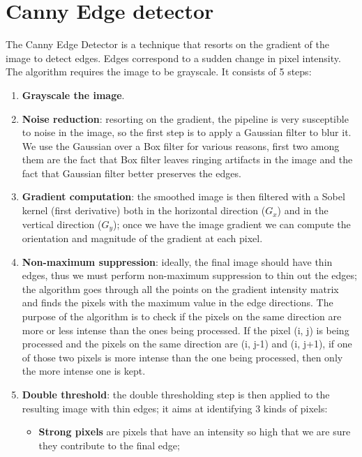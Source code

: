 \documentclass{article}
\begin{document}
\newpage

\section*{Canny Edge detector}

The Canny Edge Detector is a technique that resorts on the gradient of the image to detect
edges. Edges correspond to a sudden change in pixel intensity. The algorithm requires the image
to be grayscale. It consists of 5 steps:

\begin{enumerate}[start=0]
    \item \textbf{Grayscale the image}.
    \item \textbf{Noise reduction}: resorting on the gradient, the pipeline is very susceptible to noise in the image, so the first step is to apply a Gaussian filter to blur it. We use the Gaussian over a Box filter for various reasons, first two among them are the fact that Box filter leaves ringing artifacts in the image and the fact that Gaussian filter better preserves the edges.
    \item \textbf{Gradient computation}: the smoothed image is then filtered with a Sobel kernel (first derivative) both in the horizontal direction ($G_x$) and in the vertical direction ($G_y$); once we have the image gradient we can compute the orientation and magnitude of the gradient at each pixel.
    \item \textbf{Non-maximum suppression}: ideally, the final image should have thin edges, thus we must perform non-maximum suppression to thin out the edges; the algorithm goes through all the points on the gradient intensity matrix and finds the pixels with the maximum value in the edge directions. The purpose of the algorithm is to check if the pixels on the same direction are more or less intense than the ones being processed. If the pixel (i, j) is being processed and the pixels on the same direction are (i, j-1) and (i, j+1), if one of those two pixels is more intense than the one being processed, then only the more intense one is kept.
    \item \textbf{Double threshold}: the double thresholding step is then applied to the resulting image with thin edges;
    it aims at identifying 3 kinds of pixels:
    \begin{itemize}
        \item \textbf{Strong pixels} are pixels that have an intensity so high that we are sure they contribute to the final edge;

\end{itemize}
\end{enumerate}
\end{document}
